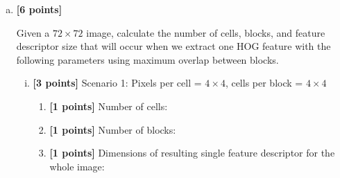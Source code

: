 \begin{enumerate}[(a)]
\item \textbf{[6 points]}
\begin{tcolorbox}[colback=orange!5!white,colframe=orange!75!black]
     Given a $72\times72$ image, calculate the number of cells, blocks, and feature descriptor size that will occur when we extract one HOG feature with the following parameters using maximum overlap between blocks.
\end{tcolorbox}

\begin{enumerate}[(i)]
    \item \textbf{[3 points]} Scenario 1: Pixels per cell = $4\times4$, cells per block = $4\times4$ %

\begin{enumerate}[1.]
    \item \textbf{[1 points]} Number of cells: 

    \item \textbf{[1 points]} Number of blocks: 

    \item \textbf{[1 points]} Dimensions of resulting single feature descriptor for the whole image: 
\end{enumerate}
\end{enumerate}
\end{enumerate}
